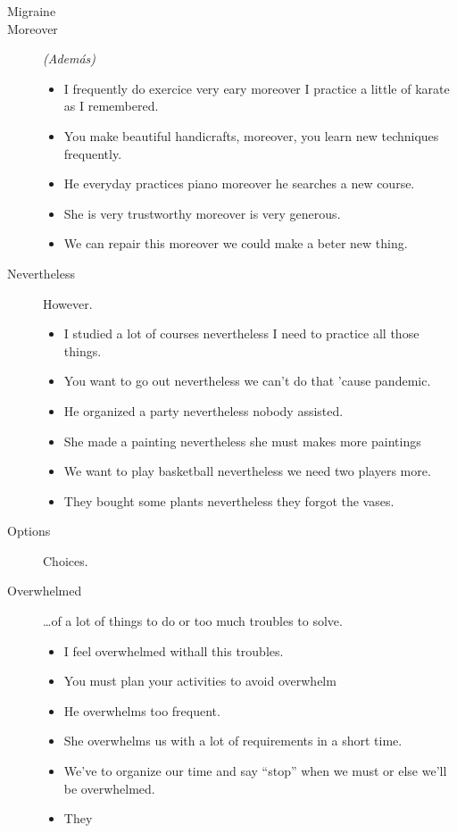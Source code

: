 \begin{multicols}{2}
\begin{description}
\item[Migraine]

\item[Moreover] \emph{(Además)}
\begin{itemize}
\item I frequently do exercice very eary moreover I practice a little of karate as I remembered.
\item You make beautiful handicrafts, moreover, you learn new techniques frequently.
\item He everyday practices piano moreover he searches a new course.
\item She is very trustworthy moreover is very generous.
\item We can repair this moreover we could make a beter new thing.
\end{itemize}

\item[Nevertheless] However.
\begin{itemize}
\item I studied a lot of courses nevertheless I need to practice all those things.
\item You want to go out nevertheless we can't do that 'cause pandemic.
\item He organized a party nevertheless nobody assisted.
\item She made a painting nevertheless she must makes more paintings
\item We want to play basketball nevertheless we need two players more.
\item They bought some plants nevertheless they forgot the vases.
\end{itemize}

\item[Options] Choices.

\item[Overwhelmed] \dots of a lot of things to do or too much troubles to solve.
\begin{itemize}
\item I feel overwhelmed withall this troubles.
\item You must plan your activities to avoid overwhelm
\item He overwhelms too frequent.
\item She overwhelms us with a lot of requirements in a short time.
\item We've to organize our time and say ``stop'' when we must or else we'll be overwhelmed.
\item They
\end{itemize}


\end{description}
\end{multicols}
